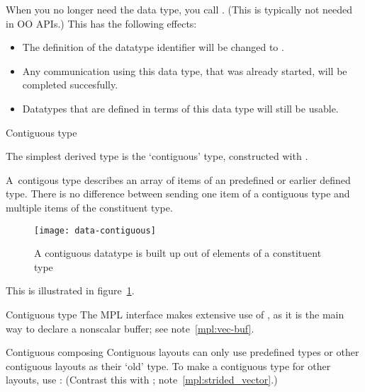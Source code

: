 When you no longer
need the data type, you call .
(This is typically not needed in \ac{OO} \acp{API}.)
This has the following effects:
\begin{itemize}
\item The definition of the datatype identifier will be changed to
  .
\item Any communication using this data type, that was already
  started, will be completed succesfully.
\item Datatypes that are defined in terms of this data type will still
  be usable.
\end{itemize}

 {Contiguous type}
\label{sec:data:contiguous}

The simplest derived type is the `contiguous' type,
constructed with .

A~contigous type describes an array of items
of an predefined or earlier defined type. There is no difference between sending
one item of a contiguous type and multiple items of the constituent type.
\begin{figure}[t]
  \texttt{[image: data-contiguous]}
  \caption{A contiguous datatype is built up out of elements of a constituent type}
  \label{fig:data-contiguous}
\end{figure}
This is illustrated in figure~\ref{fig:data-contiguous}.




\begin{mplnote}{Contiguous type}
  The \ac{MPL} interface makes extensive use of
  ,
  as it is the main way to declare a nonscalar buffer;
  see note~\ref{mpl:vec-buf}.
\end{mplnote}

\begin{mplnote}{Contiguous composing}
  \label{mpl:cont_vector}
  Contiguous layouts can only use predefined types or other contiguous layouts
  as their `old' type.
  To make a contiguous type for other layouts, use :
  (Contrast this with ; note~\ref{mpl:strided_vector}.)
\end{mplnote}

